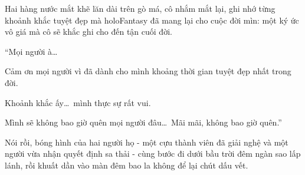 \documentclass[../main.tex]{subfiles}
\begin{document}
Hai hàng nước mắt khẽ lăn dài trên gò má, cô nhắm mắt lại, ghi nhớ từng khoảnh khắc tuyệt đẹp mà holoFantasy đã mang lại cho cuộc đời mìn: một ký ức vô giá mà cô sẽ khắc ghi cho đến tận cuối đời.

\begin{center}
    ``Mọi người à\dots

    Cảm ơn mọi người vì đã dành cho mình khoảng thời gian tuyệt đẹp nhất trong đời.

    Khoảnh khắc ấy\dots\ mình thực sự rất vui.

    Mình sẽ không bao giờ quên mọi người đâu\dots\ Mãi mãi, không bao giờ quên.''
\end{center}

Nói rồi, bóng hình của hai người họ - một cựu thành viên đã giải nghệ và một người vừa nhận quyết định sa thải - cùng bước đi dưới bầu trời đêm ngàn sao lấp lánh, rồi khuất dần vào màn đêm bao la không để lại chút dấu vết.
\end{document}
